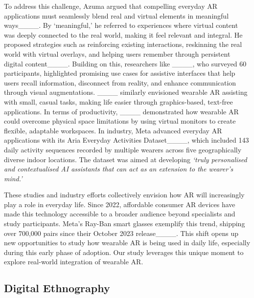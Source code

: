 To address this challenge, Azuma argued that compelling everyday AR applications must seamlessly blend real and virtual elements in meaningful ways____. By `meaningful,' he referred to experiences where virtual content was deeply connected to the real world, making it feel relevant and integral. He proposed strategies such as reinforcing existing interactions, reskinning the real world with virtual overlays, and helping users remember through persistent digital content____. Building on this, researchers like ____, who surveyed 60 participants, highlighted promising use cases for assistive interfaces that help users recall information, disconnect from reality, and enhance communication through visual augmentations. ____ similarly envisioned wearable AR assisting with small, casual tasks, making life easier through graphics-based, text-free applications. In terms of productivity, ____ demonstrated how wearable AR could overcome physical space limitations by using virtual monitors to create flexible, adaptable workspaces. In industry, Meta advanced everyday AR applications with its Aria Everyday Activities Dataset____, which included 143 daily activity sequences recorded by multiple wearers across five geographically diverse indoor locations. The dataset was aimed at developing \textit{`truly personalised and contextualised AI assistants that can act as an extension to the wearer’s mind.'}

These studies and industry efforts collectively envision how AR will increasingly play a role in everyday life. Since 2022, affordable consumer AR devices have made this technology accessible to a broader audience beyond specialists and study participants. Meta's Ray-Ban smart glasses exemplify this trend, shipping over 700,000 pairs since their October 2023 release____. This shift opens up new opportunities to study how wearable AR is being used in daily life, especially during this early phase of adoption. Our study leverages this unique moment to explore real-world integration of wearable AR.

\subsection{Digital Ethnography} 

